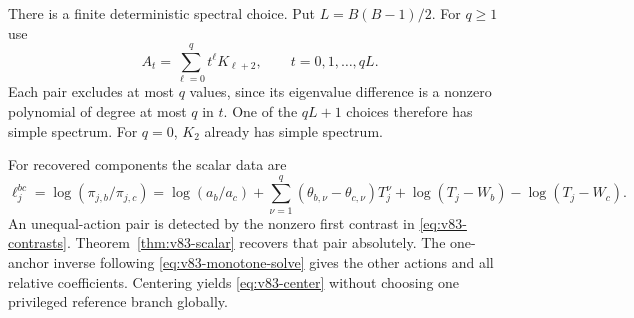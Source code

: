 There is a finite deterministic spectral choice. Put $L=B(B-1)/2$.
For $q\ge1$ use
\begin{equation}\label{eq:v83-finite-combinations}
 A_t=\sum_{\ell=0}^{q}t^\ell K_{\ell+2},\qquad
                    t=0,1,\ldots,qL.
\end{equation}
Each pair excludes at most $q$ values, since its eigenvalue difference
is a nonzero polynomial of degree at most $q$ in $t$. One of the
$qL+1$ choices therefore has simple spectrum. For $q=0$, $K_2$
already has simple spectrum.

For recovered components the scalar data are
\begin{equation}\label{eq:v83-logratios}
 \ell_j^{bc}=\log(\pi_{j,b}/\pi_{j,c})
 =\log(a_b/a_c)+\sum_{\nu=1}^q
   (\theta_{b,\nu}-\theta_{c,\nu})T_j^\nu
       +\log(T_j-W_b)-\log(T_j-W_c).
\end{equation}
An unequal-action pair is detected by the nonzero first contrast in
\eqref{eq:v83-contrasts}. Theorem~\ref{thm:v83-scalar} recovers that
pair absolutely. The one-anchor inverse following
\eqref{eq:v83-monotone-solve} gives the other actions and all relative
coefficients. Centering yields \eqref{eq:v83-center} without choosing
one privileged reference branch globally.

